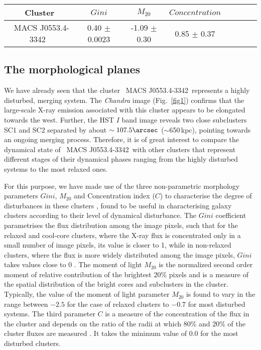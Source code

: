 \documentclass[useASM,usenatbib]{mn2e}
\newcommand{\mac}{\rm~MACS J0553.4-3342}
\begin{document}
\begin{table*}
\centering
\caption{Morphology parameters for \mac\ as discussed in \S~{\ref{morpho}}}
\label{morph_val}
\begin{tabular}{cccccccc}
\hline
Cluster &$Gini$ & $M_{20}$ & $Concentration$ &  \\
\hline
\mac~ & 0.40 $\pm$ 0.0023 & -1.09 $\pm$ 0.30 & 0.85 $\pm$ 0.37 \\
\hline
\end{tabular}
\end{table*}




\subsection{The morphological planes}
\label{morpho}

We have already seen that the cluster \mac\ represents a highly
disturbed, merging system. The {\it Chandra} image (Fig.~\ref{fig1})
confirms that the large-scale X-ray emission associated with this cluster
appears to be elongated towards the west. Further, the
HST $I$ band image reveals two close subclusters SC1 and SC2
separated by about $\sim107.5\arcsec$ ($\sim$650\,kpc), pointing
towards an ongoing merging process. Therefore, it is of great interest
to compare the dynamical state of \mac\ with other clusters that
represent different stages of their dynamical phases ranging from the
highly disturbed systems to the most relaxed ones.

For this purpose, we
have made use of the three non-parametric morphology parameters
$Gini$, $M_{20}$ and Concentration index ($C$) to characterise the
degree of disturbances in these clusters
\citep{2015A&A...575A.127P}, found to be 
useful in characterising galaxy clusters according to their level of
 dynamical disturbance. The $Gini$ coefficient parametrises the flux
distribution among the image pixels, such that for
the relaxed and cool-core clusters, where the X-ray flux is concentrated only in a
small number of image pixels, its value is closer to 1, while in
non-relaxed clusters, where the flux is more widely distributed among the image
pixels, $Gini$ takes values close to 0
\citep[e.g.][]{2004AJ....128..163L}.
The moment of light $M_{20}$ is the
normalized second order moment of relative contribution of the
brightest $20\%$ pixels \citep{2004AJ....128..163L} and is a measure
of the spatial distribution of the bright cores and subclusters in the
cluster. Typically, the value of the moment of light parameter
$M_{20}$ is found to vary in the range between $-2.5$ for the case of
relaxed clusters to $-0.7$ for most disturbed systems. The third
parameter $C$ is a measure of the concentration of the flux in the
cluster and depends on the ratio of the radii at which $80\%$ and
$20\%$ of the cluster fluxes are measured
\citep{2003ApJS..147....1C}. It takes the minimum value of 0.0 for the
most disturbed clusters.
\end{document}
